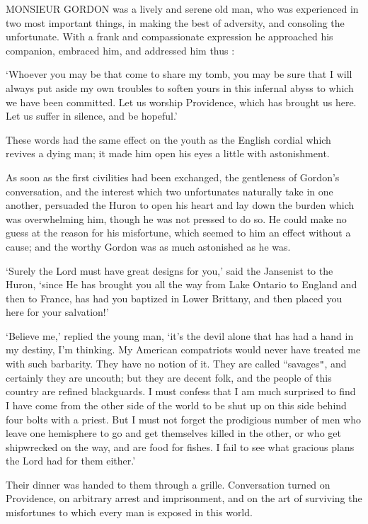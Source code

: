 \documentclass{article}
\begin{document}
\begin{center}
MONSIEUR GORDON was a lively and serene old man, who was experienced in two most 
important things, in making the best of adversity, and consoling the unfortunate. 
With a frank and compassionate expression he approached his companion, embraced 
him, and addressed him thus : 

`Whoever you may be that come to share my tomb, you may be sure that I will always 
put aside my own troubles to soften yours in this infernal abyss to which we have 
been committed. Let us worship Providence, which has brought us here. Let us suffer 
in silence, and be hopeful.' 

These words had the same effect on the youth as the English cordial which revives 
a dying man; it made him open his eyes a little with astonishment. 

As soon as the first civilities had been exchanged, the gentleness of Gordon's 
conversation, and the interest which two unfortunates naturally take in one another, 
persuaded the Huron to open his heart and lay down the burden which was overwhelming 
him, though he was not pressed to do so. He could make no guess at the reason for 
his misfortune, which seemed to him an effect without a cause; and the worthy Gordon 
was as much astonished as he was. 

`Surely the Lord must have great designs for you,' said the Jansenist to the Huron, 
`since He has brought you all the way from Lake Ontario to England and then to 
France, has had you baptized in Lower Brittany, and then placed you here for your 
salvation!' 

`Believe me,' replied the young man, `it's the devil alone that has had a hand 
in my destiny, I'm thinking. My American compatriots would never have treated me 
with such barbarity. They have no notion of it. They are called ``savages\texttt{"}, 
and certainly they are uncouth; but they are decent folk, and the people of this 
country are refined blackguards. I must confess that I am much surprised to find 
I have come from the other side of the world to be shut up on this side behind 
four bolts with a priest. But I must not forget the prodigious number of men who 
leave one hemisphere to go and get themselves killed in the other, or who get shipwrecked 
on the way, and are food for fishes. I fail to see what gracious plans the Lord 
had for them either.' 

Their dinner was handed to them through a grille. Conversation turned on Providence, 
on arbitrary arrest and imprisonment, and on the art of surviving the misfortunes 
to which every man is exposed in this world. 


\end{center}
\end{document}

